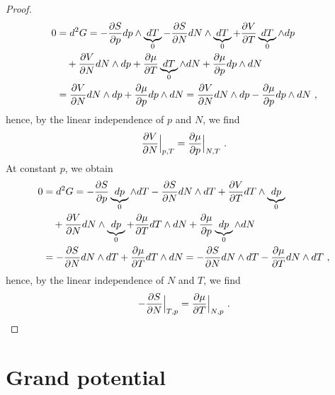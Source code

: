 \begin{proof}
\begin{equation*}
\begin{aligned}
            0 & = d^2 G = - \frac{\partial S}{\partial p} dp \wedge \underbrace{dT}_0 - \frac{\partial S}{\partial N} dN \wedge \underbrace{dT}_0 + \frac{\partial V}{\partial T} \underbrace{dT}_0 \wedge dp \\ & \quad + \frac{\partial V}{\partial N} dN \wedge dp + \frac{\partial\mu}{\partial T} \underbrace{dT}_0 \wedge dN + \frac{\partial\mu}{\partial p} dp \wedge dN \\ & = \frac{\partial V}{\partial N} dN \wedge dp + \frac{\partial\mu}{\partial p} dp \wedge dN = \frac{\partial V}{\partial N} dN \wedge dp - \frac{\partial\mu}{\partial p} dp \wedge dN ~,
        \end{aligned}
        \end{equation*}
        hence, by the linear independence of $p$ and $N$, we find
        \begin{equation*}
            \frac{\partial V}{\partial N} \Big \vert_{p,T} = \frac{\partial\mu}{\partial p} \Big \vert_{N, T} ~.
        \end{equation*}
        At constant $p$, we obtain
        \begin{equation*}
        \begin{aligned}
            0 & = d^2 G = - \frac{\partial S}{\partial p} \underbrace{dp}_0 \wedge dT - \frac{\partial S}{\partial N} dN \wedge dT + \frac{\partial V}{\partial T} dT \wedge \underbrace{dp}_0 \\ & \quad + \frac{\partial V}{\partial N} dN \wedge \underbrace{dp}_0 + \frac{\partial\mu}{\partial T} dT \wedge dN + \frac{\partial\mu}{\partial p} \underbrace{dp}_0 \wedge dN \\ & = - \frac{\partial S}{\partial N} dN \wedge dT + \frac{\partial\mu}{\partial T} dT \wedge dN = - \frac{\partial S}{\partial N} dN \wedge dT - \frac{\partial\mu}{\partial T} dN \wedge dT ~,
        \end{aligned}
        \end{equation*}
        hence, by the linear independence of $N$ and $T$, we find
        \begin{equation*}
            - \frac{\partial S}{\partial N} \Big \vert_{T,p} = \frac{\partial\mu}{\partial T} \Big \vert_{N, p} ~.
        \end{equation*}
    \end{proof}

\section{Grand potential} 

